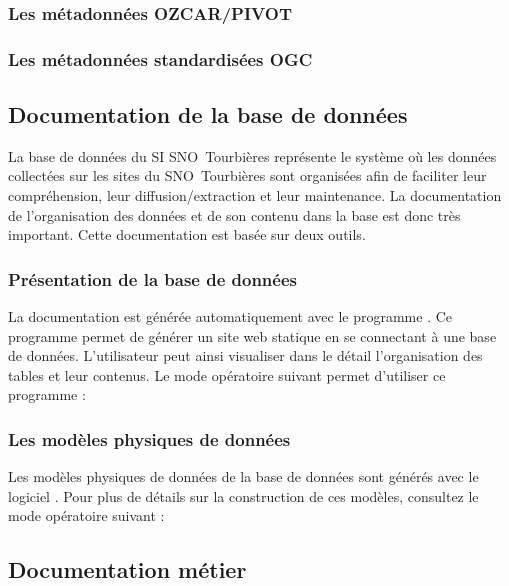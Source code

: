 \documentclass[]{article}
\newcommand{\mhref}[3][blue]{\href{#2}{\color{#1}{#3}}}%
\newcommand{\SNOT}{{SNO~Tourbières }}
\begin{document}
\subsubsection{Les métadonnées OZCAR/PIVOT}

\subsubsection{Les métadonnées standardisées OGC}

\subsection{Documentation de la base de données}

La base de données du SI \SNOT représente le système où les données collectées sur les sites du \SNOT sont organisées afin de faciliter leur compréhension, leur diffusion/extraction et leur maintenance. La documentation de l'organisation des données et de son contenu dans la base est donc très important. Cette documentation est basée sur deux outils.

\subsubsection{Présentation de la base de données}

La documentation est générée automatiquement avec le programme \mhref{http://schemaspy.org/}{schemaspy.jar}. Ce programme permet de générer un site web statique en se connectant à une base de données. L'utilisateur peut ainsi visualiser dans le détail l'organisation des tables et leur contenus. Le mode opératoire suivant permet d'utiliser ce programme : %

\subsubsection{Les modèles physiques de données}

Les modèles physiques de données de la base de données sont générés avec le logiciel \mhref{https://pgmodeler.io/}{pgmodeler}. Pour plus de détails sur la construction de ces modèles, consultez le mode opératoire suivant : %

\subsection{Documentation métier}
\end{document}
